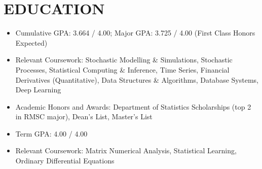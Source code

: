 \documentclass[classic]{resume}
\begin{document}
    \address{Wu Yee Sun College, CUHK, Shatin, N.T., Hong Kong SAR}
    \maketitle
    \section{EDUCATION}

    \begin{itemize}
        \item Cumulative GPA: 3.664 / 4.00; Major GPA: 3.725 / 4.00 (First Class Honors Expected)
        \item Relevant Coursework: Stochastic Modelling \& Simulations, Stochastic Processes, Statistical Computing \& Inference, Time Series, Financial Derivatives (Quantitative), Data Structures \& Algorithms, Database Systems, Deep Learning
        \item Academic Honors and Awards: Department of Statistics Scholarships (top 2 in RMSC major), Dean's List, Master's List
    \end{itemize}

    \begin{itemize}
        \item Term GPA: 4.00 / 4.00
        \item Relevant Coursework: Matrix Numerical Analysis, Statistical Learning, Ordinary Differential Equations
    \end{itemize}

\end{document}
